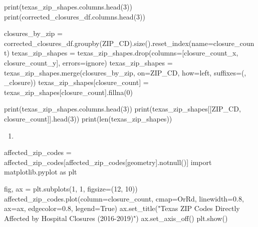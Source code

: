 \documentclass[
  letterpaper,
  DIV=11,
  numbers=noendperiod]{scrartcl}
\newenvironment{Shaded}{\begin{snugshade}}{\end{snugshade}}
\newcommand{\NormalTok}[1]{\textcolor[rgb]{0.00,0.23,0.31}{#1}}
\providecommand{\tightlist}{%
  \setlength{\itemsep}{0pt}\setlength{\parskip}{0pt}}\usepackage{longtable,booktabs,array}
\begin{document}
\begin{Shaded}
\begin{Highlighting}[]
\NormalTok{print(texas\_zip\_shapes.columns.head(3))}
\NormalTok{print(corrected\_closures\_df.columns.head(3))}

\NormalTok{closures\_by\_zip = corrected\_closures\_df.groupby(\textquotesingle{}ZIP\_CD\textquotesingle{}).size().reset\_index(name=\textquotesingle{}closure\_count\textquotesingle{})}
\NormalTok{texas\_zip\_shapes = texas\_zip\_shapes.drop(columns=[\textquotesingle{}closure\_count\_x\textquotesingle{}, \textquotesingle{}closure\_count\_y\textquotesingle{}], errors=\textquotesingle{}ignore\textquotesingle{})}
\NormalTok{texas\_zip\_shapes = texas\_zip\_shapes.merge(closures\_by\_zip, on=\textquotesingle{}ZIP\_CD\textquotesingle{}, how=\textquotesingle{}left\textquotesingle{}, suffixes=(\textquotesingle{}\textquotesingle{}, \textquotesingle{}\_closure\textquotesingle{}))}
\NormalTok{texas\_zip\_shapes[\textquotesingle{}closure\_count\textquotesingle{}] = texas\_zip\_shapes[\textquotesingle{}closure\_count\textquotesingle{}].fillna(0)}

\NormalTok{print(texas\_zip\_shapes.columns.head(3))}
\NormalTok{print(texas\_zip\_shapes[[\textquotesingle{}ZIP\_CD\textquotesingle{}, \textquotesingle{}closure\_count\textquotesingle{}]].head(3))}
\NormalTok{print(len(texas\_zip\_shapes))}
\end{Highlighting}
\end{Shaded}

\begin{enumerate}
\def\labelenumi{\arabic{enumi}.}
\setcounter{enumi}{2}
\tightlist
\item
\end{enumerate}

\begin{Shaded}
\begin{Highlighting}[]
\NormalTok{affected\_zip\_codes = affected\_zip\_codes[affected\_zip\_codes[\textquotesingle{}geometry\textquotesingle{}].notnull()]}
\NormalTok{import matplotlib.pyplot as plt}

\NormalTok{fig, ax = plt.subplots(1, 1, figsize=(12, 10))}
\NormalTok{affected\_zip\_codes.plot(column=\textquotesingle{}closure\_count\textquotesingle{}, cmap=\textquotesingle{}OrRd\textquotesingle{}, linewidth=0.8, ax=ax, edgecolor=\textquotesingle{}0.8\textquotesingle{}, legend=True)}
\NormalTok{ax.set\_title("Texas ZIP Codes Directly Affected by Hospital Closures (2016{-}2019)")}
\NormalTok{ax.set\_axis\_off()}
\NormalTok{plt.show()}
\end{Highlighting}
\end{Shaded}
\end{document}
